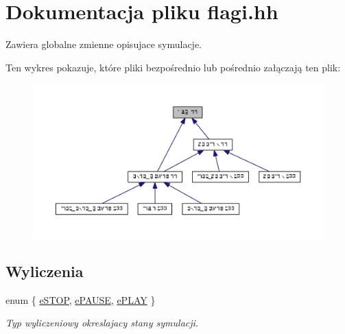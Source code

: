 \hypertarget{flagi_8hh}{}\section{Dokumentacja pliku flagi.\+hh}
\label{flagi_8hh}


Zawiera globalne zmienne opisujace symulacje.  


Ten wykres pokazuje, które pliki bezpośrednio lub pośrednio załączają ten plik\+:\nopagebreak
\begin{figure}[H]
\begin{center}
\leavevmode
\includegraphics[width=350pt]{flagi_8hh__dep__incl}
\end{center}
\end{figure}
\subsection*{Wyliczenia}
\begin{DoxyCompactItemize}
\item 
enum \{ \hyperlink{flagi_8hh_a06fc87d81c62e9abb8790b6e5713c55ba4957581ee0386c284fd318121e335af6}{e\+S\+T\+O\+P}, 
\hyperlink{flagi_8hh_a06fc87d81c62e9abb8790b6e5713c55ba6a2f69efc37338427ecd0db296923a79}{e\+P\+A\+U\+S\+E}, 
\hyperlink{flagi_8hh_a06fc87d81c62e9abb8790b6e5713c55baecdbae639704e0b7e4b5478734e45b8d}{e\+P\+L\+A\+Y}
 \}
\begin{DoxyCompactList}\small\item\em Typ wyliczeniowy okreslajacy stany symulacji. \end{DoxyCompactList}\end{DoxyCompactItemize}
